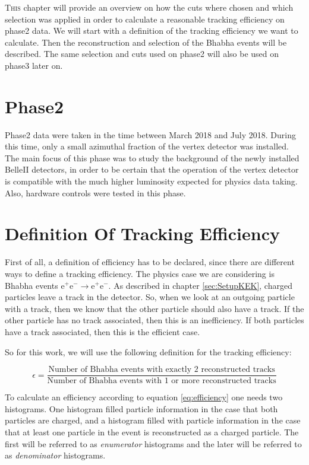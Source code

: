 \documentclass[a4paper,11pt,twosided,final,german,openbib,pdftex,listof=totoc,bibliography=totoc]{scrbook}
\begin{document}
\lettrine{T}{his} chapter will provide an overview on how the cuts where chosen and which selection was applied in order to calculate a reasonable tracking efficiency on phase2 data. We will start with a definition of the tracking efficiency we want to calculate. Then the reconstruction and selection of the Bhabha events will be described. The same selection and cuts used on phase2 will also be used on phase3 later on.

\section{Phase2}
\label{sec:Phase2}

Phase2 data were taken in the time between March 2018 and July 2018. During this time, only a small azimuthal fraction of the vertex detector was installed. The main focus of this phase was to study the background of the newly installed BelleII detectors, in order to be certain that the operation of the vertex detector is compatible with the much higher luminosity expected for physics data taking. Also, hardware controls were tested in this phase.


\section{Definition Of Tracking Efficiency}
\label{sec:Eff}

First of all, a definition of efficiency has to be declared, since there are different ways to define a tracking efficiency. The physics case we are considering is Bhabha events $ \textrm{e}^+ \textrm{e}^- \rightarrow \textrm{e}^+ \textrm{e}^- $. As described in chapter \ref{sec:SetupKEK}, charged particles leave a track in the detector. So, when we look at an outgoing particle with a track, then we know that the other particle should also have a track. If the other particle has no track associated, then this is an inefficiency. If both particles have a track associated, then this is the efficient case.

So for this work, we will use the following definition for the tracking efficiency:

\begin{equation}
	\epsilon = \frac{\textrm{Number of Bhabha events with exactly 2 reconstructed tracks}}{\textrm{Number of Bhabha events with 1 or more reconstructed tracks}}
	\label{eq:efficiency}
\end{equation}


To calculate an efficiency according to equation \ref{eq:efficiency} one needs two histograms. One histogram filled particle information in the case that both particles are charged, and a histogram filled with particle information in the case that at least one particle in the event is reconstructed as a charged particle. The first will be referred to as \textit{enumerator} histograms and the later will be referred to as \textit{denominator} histograms.
\end{document}
